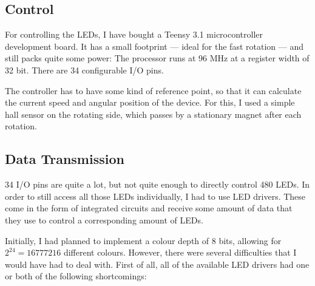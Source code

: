 \documentclass[a4paper, 11pt, titlepage]{report}
\begin{document}
\subsection{Control}

For controlling the LEDs, I have bought a Teensy 3.1 microcontroller development board. It has a
small footprint --- ideal for the fast rotation --- and still packs quite some power: The processor
runs at 96 MHz at a register width of 32 bit. There are 34 configurable I/O pins.

The controller has to have some kind of reference point, so that it can calculate the current speed
and angular position of the device. For this, I used a simple hall sensor on the rotating side,
which passes by a stationary magnet after each rotation.



\subsection{Data Transmission}

34 I/O pins are quite a lot, but not quite enough to directly control 480 LEDs. In order to still
access all those LEDs individually, I had to use LED drivers. These come in the form of integrated
circuits and receive some amount of data that they use to control a corresponding amount of LEDs.

Initially, I had planned to implement a colour depth of 8 bits, allowing for
$2^{24} = 16777216$ different colours. However, there were several difficulties that I would have
had to deal with. First of all, all of the available LED drivers had one or both of the following
shortcomings:
\end{document}
